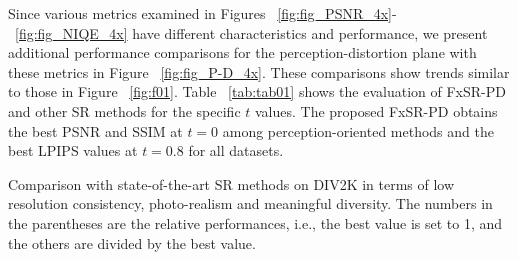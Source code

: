\documentclass{article}
\begin{document}
Since various metrics examined in Figures ~\ref{fig:fig_PSNR_4x}-~\ref{fig:fig_NIQE_4x} have different characteristics and performance, we present additional performance comparisons for the perception-distortion plane with these metrics in Figure ~\ref{fig:fig_P-D_4x}. These comparisons show trends similar to those in Figure ~\ref{fig:f01}.
Table ~\ref{tab:tab01} shows the evaluation of FxSR-PD and other SR methods for the specific $t$ values. The proposed FxSR-PD obtains the best PSNR and SSIM at $t=0$ among perception-oriented methods and the best LPIPS values at $t=0.8$ for all datasets.

\begin{table}[!ht]
\caption{Comparison with state-of-the-art SR methods on DIV2K in terms of low resolution consistency, photo-realism and meaningful diversity. The numbers in the parentheses are the relative performances, i.e., the best value is set to 1, and the others are divided by the best value.}



\end{table}
\end{document}
